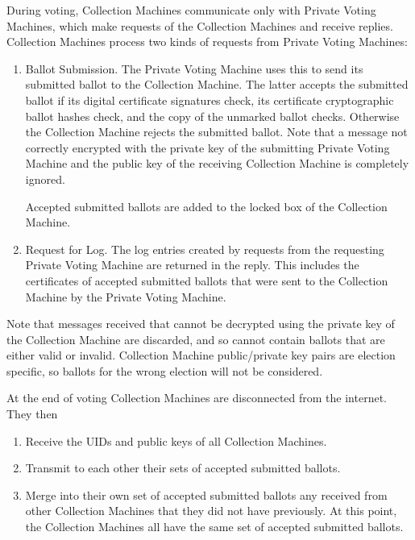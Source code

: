 \documentclass[12pt]{article}
\begin{document}
During voting, Collection Machines communicate only with
Private Voting Machines, which make requests of the Collection
Machines and receive replies.
Collection Machines process two kinds of requests from
Private Voting Machines:
\begin{enumerate}

\item
Ballot Submission.  The Private Voting Machine uses this to send
its submitted ballot to the Collection Machine.  The latter accepts
the submitted ballot if its digital certificate signatures check,
its certificate cryptographic ballot hashes check,
and the copy of the unmarked ballot checks.
Otherwise the Collection Machine rejects the submitted
ballot.  Note that a message not correctly encrypted with
the private key of the submitting Private Voting Machine and the
public key of the receiving Collection Machine is completely ignored.

Accepted submitted ballots are added to the locked box of the
Collection Machine.

\item
Request for Log.  The log entries created by requests from the
requesting Private Voting Machine are returned in the reply.
This includes the certificates of accepted submitted ballots
that were sent to the Collection Machine
by the Private Voting Machine.

\end{enumerate}

Note that messages received that cannot be decrypted using the
private key of the Collection Machine
are discarded, and so cannot contain
ballots that are either valid or invalid.  Collection Machine
public/private key pairs are election specific, so ballots for
the wrong election will not be considered.

At the end of voting Collection Machines are disconnected from
the internet.  They then
\begin{enumerate}
\item Receive the UIDs and public keys of all Collection Machines.
\item Transmit to each other their sets of accepted submitted ballots.
\item Merge into their own set of accepted submitted ballots any
received from other Collection Machines that they did not have previously.
At this point, the Collection Machines all have the same set of accepted
submitted ballots.
\setcounter{CMC-COUNTER}{\value{enumi}}
\end{enumerate}
\end{document}
